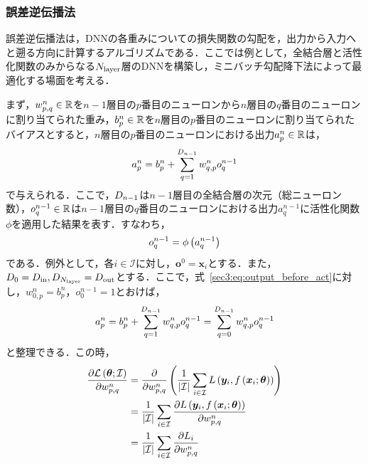 \subsubsection{誤差逆伝播法}
\label{sec3:sec:backpropagation}
誤差逆伝播法は，DNNの各重みについての損失関数の勾配を，出力から入力へと遡る方向に計算するアルゴリズムである．ここでは例として，全結合層と活性化関数のみからなる$N_{\text{layer}}$層のDNNを構築し，ミニバッチ勾配降下法によって最適化する場面を考える\cite{higham2019deep}．

まず，$w_{p, q}^{n} \in \mathbb{R}$を$n - 1$層目の$p$番目のニューロンから$n$層目の$q$番目のニューロンに割り当てられた重み，$b_{p}^{n} \in \mathbb{R}$を$n$層目の$p$番目のニューロンに割り当てられたバイアスとすると，$n$層目の$p$番目のニューロンにおける出力$a_{p}^{n} \in \mathbb{R}$は，
\begin{equation}
    \label{sec3:eq:output_before_act}
    a_{p}^{n} = b_{p}^{n} + \sum_{q = 1}^{D_{n - 1}} w_{q, p}^{n} o_{q}^{n - 1}
\end{equation}
で与えられる．ここで，$D_{n - 1}$は$n - 1$層目の全結合層の次元（総ニューロン数），$o_{q}^{n - 1} \in \mathbb{R}$は$n - 1$層目の$q$番目のニューロンにおける出力$a_{q}^{n - 1}$に活性化関数$\phi$を適用した結果を表す．すなわち，
\begin{equation}
    o_{q}^{n - 1} = \phi\left(a_{q}^{n - 1}\right)
\end{equation}
である．例外として，各$i \in \mathcal{I}$に対し，$\bm{o}^{0} = \bm{x}_{i}$とする．また，$D_{0} = D_{\text{in}}, D_{N_{\text{layer}}} = D_{\text{out}}$とする．ここで，式~\eqref{sec3:eq:output_before_act}に対し，$w_{0, p}^{n} = b_{p}^{n}$，$o_{0}^{n - 1} = 1$とおけば，
\begin{equation}
    \label{sec3:eq:output_before_act_2}
    a_{p}^{n} = b_{p}^{n} + \sum_{q = 1}^{D_{n - 1}} w_{q, p}^{n} o_{q}^{n - 1}
    = \sum_{q = 0}^{D_{n - 1}} w_{q, p}^{n} o_{q}^{n - 1}
\end{equation}
と整理できる．この時，
\begin{align}
    \pdv{\mathcal{L}\left(\bm{\theta}; \mathcal{I}\right)}{w_{p, q}^{n}} & = \pdv{w_{p, q}^{n}} \left(\frac{1}{|\mathcal{I}|} \sum_{i \in \mathcal{I}} L\left(\bm{y}_{i}, f\left(\bm{x}_{i}; \bm{\theta}\right)\right)\right) \\
                                                                                                & = \frac{1}{|\mathcal{I}|} \sum_{i \in \mathcal{I}} \pdv{L\left(\bm{y}_{i}, f\left(\bm{x}_{i}; \bm{\theta}\right)\right)}{w_{p, q}^{n}}     \\
                                                                                                & = \frac{1}{|\mathcal{I}|} \sum_{i \in \mathcal{I}} \pdv{L_{i}}{w_{p, q}^{n}}
\end{align}
